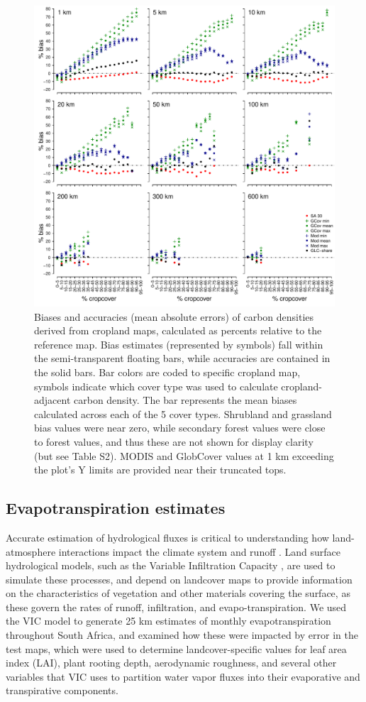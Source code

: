 \documentclass{pnastwo}
\begin{document}
\begin{article}
\begin{figure}[!h]
\centerline{\includegraphics[width=.5\textwidth]{figures/figure3.pdf}}
\caption{Biases and accuracies (mean absolute errors) of carbon densities derived from cropland maps, calculated as percents relative to the reference map. Bias estimates (represented by symbols) fall within the semi-transparent floating bars, while accuracies are contained in the solid bars. Bar colors are coded to specific cropland map, symbols indicate which cover type was used to calculate cropland-adjacent carbon density. The bar represents the mean biases calculated across each of the 5 cover types. Shrubland and grassland bias values were near zero, while secondary forest values were close to forest values, and thus these are not shown for display clarity (but see Table S2). MODIS and GlobCover values at 1 km exceeding the plot's Y limits are provided near their truncated tops.}
\label{afoto}
\end{figure}

\subsection{Evapotranspiration estimates}
Accurate estimation of hydrological fluxes is critical to understanding how land-atmosphere interactions impact the climate system and runoff \cite{liang_simple_1994}. Land surface hydrological models, such as the Variable Infiltration Capacity \cite{liang_simple_1994}, are used to simulate these processes, and depend on landcover maps to provide information on the characteristics of vegetation and other materials covering the surface, as these govern the rates of runoff, infiltration, and evapo-transpiration. We used the VIC model to generate 25 km estimates of monthly evapotranspiration throughout South Africa, and examined how these were impacted by error in the test maps, which were used to determine landcover-specific values for leaf area index (LAI), plant rooting depth, aerodynamic roughness, and several other variables that VIC uses to partition water vapor fluxes into their evaporative and transpirative components. 


\end{article}
\end{document}
